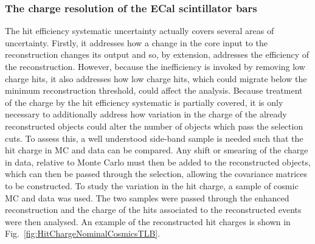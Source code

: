 \subsubsection{The charge resolution of the ECal scintillator bars}
The hit efficiency systematic uncertainty actually covers several areas of uncertainty.  Firstly, it addresses how a change in the core input to the reconstruction changes its output and so, by extension, addresses the efficiency of the reconstruction.  However, because the inefficiency is invoked by removing low charge hits, it also addresses how low charge hits, which could migrate below the minimum reconstruction threshold, could affect the analysis.  Because treatment of the charge by the hit efficiency systematic is partially covered, it is only necessary to additionally address how variation in the charge of the already reconstructed objects could alter the number of objects which pass the selection cuts.  To assess this, a well understood side-band sample is needed such that the hit charge in MC and data can be compared.  Any shift or smearing of the charge in data, relative to Monte Carlo must then be added to the reconstructed objects, which can then be passed through the selection, allowing the covariance matrices to be constructed.  To study the variation in the hit charge, a sample of cosmic MC and data was used.  The two samples were passed through the enhanced reconstruction and the charge of the hits associated to the reconstructed events were then analysed.  An example of the reconstructed hit charges is shown in Fig.~\ref{fig:HitChargeNominalCosmicsTLB}.  
